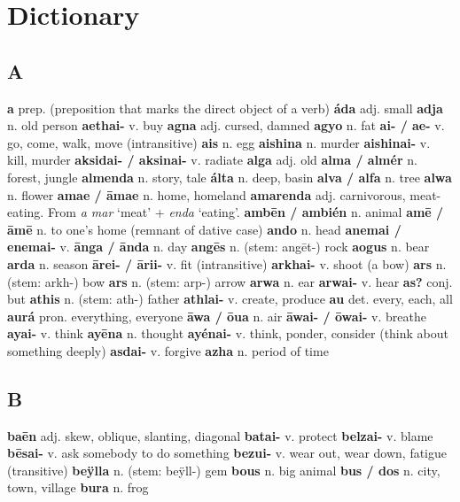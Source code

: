 \chapter{Dictionary}

\newcommand{\entry}[3]{\textbf{#1} #2. #3\newline}

\begin{multicols}{3}

\section*{A}
\entry{a}{prep}{(preposition that marks the direct object of a verb)}
\entry{áda}{adj}{small}
\entry{adja}{n}{old person}
\entry{aethai-}{v}{buy}
\entry{agna}{adj}{cursed, damned}
\entry{agyo}{n}{fat}
\entry{ai- / ae-}{v}{go, come, walk, move (intransitive)}
\entry{ais}{n}{egg}
\entry{aishina}{n}{murder}
\entry{aishinai-}{v}{kill, murder}
\entry{aksidai- / aksinai-}{v}{radiate}
\entry{alga}{adj}{old}
\entry{alma / almér}{n}{forest, jungle}
\entry{almenda}{n}{story, tale}
\entry{álta}{n}{deep, basin}
\entry{alva / alfa}{n}{tree}
\entry{alwa}{n}{flower}
\entry{amae / āmae}{n}{home, homeland}
\entry{amarenda}{adj}{carnivorous, meat-eating. From \emph{a mar} `meat' + \emph{enda} `eating'.}
\entry{ambēn / ambién}{n}{animal}
\entry{amē / āmē}{n}{to one's home (remnant of dative case)}
\entry{ando}{n}{head}
\entry{anemai / enemai-}{v}{}
\entry{ānga / ānda}{n}{day}
\entry{angēs}{n}{(stem: angēt-) rock}
\entry{aogus}{n}{bear}
\entry{arda}{n}{season}
\entry{ārei- / ārii-}{v}{fit (intransitive)}
\entry{arkhai-}{v}{shoot (a bow)}
\entry{ars}{n}{(stem: arkh-) bow}
\entry{ars}{n}{(stem: arp-) arrow}
\entry{arwa}{n}{ear}
\entry{arwai-}{v}{hear}
\entry{as?}{conj}{but}
\entry{athis}{n}{(stem: ath-) father}
\entry{athlai-}{v}{create, produce}
\entry{au}{det}{every, each, all}
\entry{aurá}{pron}{everything, everyone}
\entry{āwa / ōua}{n}{air}
\entry{āwai- / ōwai-}{v}{breathe}
\entry{ayai-}{v}{think}
\entry{ayēna}{n}{thought}
\entry{ayénai-}{v}{think, ponder, consider (think about something deeply)}
\entry{asdai-}{v}{forgive}
\entry{azha}{n}{period of time}

\section*{B}
\entry{baēn}{adj}{skew, oblique, slanting, diagonal}
\entry{batai-}{v}{protect}
\entry{belzai-}{v}{blame}
\entry{bēsai-}{v}{ask somebody to do something}
\entry{bezui-}{v}{wear out, wear down, fatigue (transitive)}
\entry{beÿlla}{n}{(stem: beÿll-) gem}
\entry{bous}{n}{big animal}
\entry{bus / dos}{n}{city, town, village}
\entry{bura}{n}{frog}


\end{multicols}
